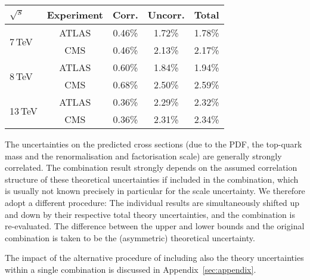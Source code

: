 \begin{enumerate}
    \newcommand{\tableWidthLumi}{2.5cm}
    \begin{table*}[ht]
    \centering
    \label{tab:lumitable}
    \begin{tabular}{l c c c c}
    $\sqrt{s}$                & Experiment & Corr.  & Uncorr. & Total \\
    \midrule
    \multirow{2}{*}{7\,TeV}   &  ATLAS     &  0.46\%  &  1.72\%  &  1.78\% \\
                              &  CMS       &  0.46\%  &  2.13\%  &  2.17\% \\[7pt]
    \multirow{2}{*}{8\,TeV}   &  ATLAS     &  0.60\%  &  1.84\%  &  1.94\% \\
                              &  CMS       &  0.68\%  &  2.50\%  &  2.59\% \\[7pt]
    \multirow{2}{*}{13\,TeV}  &  ATLAS     &  0.36\%  &  2.29\%  &  2.32\% \\
                              &  CMS       &  0.36\%  &  2.31\%  &  2.34\% \\
    \end{tabular} 
    \end{table*} 

\end{enumerate}

The uncertainties on the predicted cross sections (due to the PDF, the
top-quark mass and the renormalisation and factorisation scale) 
are generally strongly correlated. 
%
The combination result strongly depends on the assumed correlation
structure of these theoretical uncertainties if included in the
combination, which is usually not known precisely in particular for
the scale uncertainty.
%
We therefore adopt
a different procedure: The individual results are
simultaneously shifted up and down by their respective total theory uncertainties, and the
combination is re-evaluated.
% 
The difference between the upper and
lower bounds and the original combination is taken to be the
(asymmetric) theoretical uncertainty.

The impact of the alternative procedure of including also the theory
uncertainties within a single combination is discussed in
Appendix~\ref{sec:appendix}.

